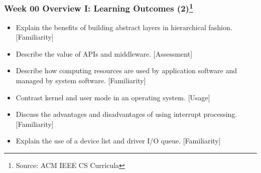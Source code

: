 \begin{frame}[fragile]
\frametitle{Week 00 Overview I:
Learning Outcomes (2)\footnote{Source: ACM IEEE CS Curricula}}
\begin{itemize}
\item Explain the benefits of building abstract layers in hierarchical fashion.  [Familiarity] 
\item Describe the value of APIs and middleware. [Assessment]
\item Describe how computing resources are used by application software and managed by system software.  [Familiarity] 
\item Contrast kernel and user mode in an operating system. [Usage]
\item Discuss the advantages and disadvantages of using interrupt processing. [Familiarity] 
\item Explain the use of a device list and driver I/O queue. [Familiarity] 
\end{itemize}
\end{frame}

